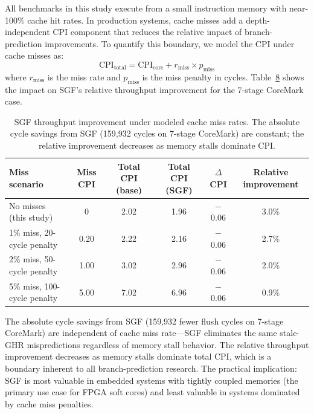 \documentclass[journal]{IEEEtran}
\begin{document}
\begin{table}[t]
\begin{table}[t]
\begin{table}[t]
\begin{table}[t]
\begin{table}[t]
\begin{table}[t]
\begin{table}[t]
All benchmarks in this study execute from a small instruction memory with near-100\% cache hit rates. In production systems, cache misses add a depth-independent CPI component that reduces the relative impact of branch-prediction improvements. To quantify this boundary, we model the CPI under cache misses as:
\begin{equation}
\text{CPI}_{\text{total}} = \text{CPI}_{\text{core}} + r_{\text{miss}} \times p_{\text{miss}}
\end{equation}
where $r_{\text{miss}}$ is the miss rate and $p_{\text{miss}}$ is the miss penalty in cycles. Table~\ref{tab:cache_sensitivity} shows the impact on SGF's relative throughput improvement for the 7-stage CoreMark case.

\begin{table}[t]
\centering
\caption{SGF throughput improvement under modeled cache miss rates. The absolute cycle savings from SGF (159{,}932 cycles on 7-stage CoreMark) are constant; the relative improvement decreases as memory stalls dominate CPI.}
\label{tab:cache_sensitivity}
\small
\begin{tabular}{@{}lccccc@{}}
\toprule
\textbf{Miss scenario} & \textbf{Miss CPI} & \textbf{Total CPI (base)} & \textbf{Total CPI (SGF)} & \textbf{$\Delta$CPI} & \textbf{Relative improvement} \\
\midrule
No misses (this study)       & 0     & 2.02 & 1.96 & $-$0.06 & 3.0\% \\
1\% miss, 20-cycle penalty   & 0.20  & 2.22 & 2.16 & $-$0.06 & 2.7\% \\
2\% miss, 50-cycle penalty   & 1.00  & 3.02 & 2.96 & $-$0.06 & 2.0\% \\
5\% miss, 100-cycle penalty  & 5.00  & 7.02 & 6.96 & $-$0.06 & 0.9\% \\
\bottomrule
\end{tabular}
\end{table}

The absolute cycle savings from SGF (159{,}932 fewer flush cycles on 7-stage CoreMark) are independent of cache miss rate---SGF eliminates the same stale-GHR mispredictions regardless of memory stall behavior. The relative throughput improvement decreases as memory stalls dominate total CPI, which is a boundary inherent to all branch-prediction research. The practical implication: SGF is most valuable in embedded systems with tightly coupled memories (the primary use case for FPGA soft cores) and least valuable in systems dominated by cache miss penalties.


\end{table}
\end{table}
\end{table}
\end{table}
\end{table}
\end{table}
\end{table}
\end{document}
